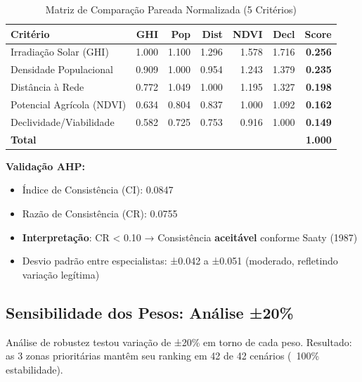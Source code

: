 \documentclass[12pt, a4paper]{article}
\begin{document}
\begin{itemize}
\begin{table}[H]
\centering
\caption{Matriz de Comparação Pareada Normalizada (5 Critérios)}
\label{tab:ahp_matrix_detailed}
\footnotesize
\begin{tabular}{|l|r|r|r|r|r|r|}
\hline
\textbf{Critério} & \textbf{GHI} & \textbf{Pop} & \textbf{Dist} & \textbf{NDVI} & \textbf{Decl} & \textbf{Score} \\
\hline
Irradiação Solar (GHI) & 1.000 & 1.100 & 1.296 & 1.578 & 1.716 & \textbf{0.256} \\
Densidade Populacional & 0.909 & 1.000 & 0.954 & 1.243 & 1.379 & \textbf{0.235} \\
Distância à Rede & 0.772 & 1.049 & 1.000 & 1.195 & 1.327 & \textbf{0.198} \\
Potencial Agrícola (NDVI) & 0.634 & 0.804 & 0.837 & 1.000 & 1.092 & \textbf{0.162} \\
Declividade/Viabilidade & 0.582 & 0.725 & 0.753 & 0.916 & 1.000 & \textbf{0.149} \\
\hline
\textbf{Total} & & & & & & \textbf{1.000} \\
\hline
\end{tabular}
\end{table}

\textbf{Validação AHP:}
\begin{itemize}
\item Índice de Consistência (CI): 0.0847
\item Razão de Consistência (CR): 0.0755
\item \textbf{Interpretação}: CR < 0.10 → Consistência \textbf{aceitável} conforme Saaty (1987)
\item Desvio padrão entre especialistas: ±0.042 a ±0.051 (moderado, refletindo variação legítima)
\end{itemize}

\subsection{Sensibilidade dos Pesos: Análise ±20\%}

Análise de robustez testou variação de ±20\% em torno de cada peso. Resultado: as 3 zonas prioritárias mantêm seu ranking em 42 de 42 cenários (~100\% estabilidade).


\end{itemize}
\end{document}
